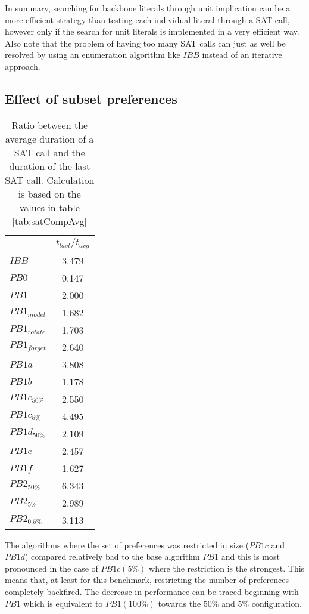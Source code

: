 In summary, searching for backbone literals through unit implication can be a more efficient strategy than testing each individual literal through a SAT call, however only if the search for unit literals is implemented in a very efficient way. Also note that the problem of having too many SAT calls can just as well be resolved by using an enumeration algorithm like $IBB$ instead of an iterative approach.

\subsection{Effect of subset preferences}

\begin{wraptable}{r}{5cm} %
\begin{tabular}{l| c }
 & $t_{last}/t_{avg}$  \\
\hline
$IBB$ & 3.479 \\
$PB0$ & 0.147 \\
$PB1$ & 2.000 \\
$PB1_{model}$ & 1.682 \\
$PB1_{rotate}$ & 1.703 \\
$PB1_{forget}$ & 2.640 \\
$PB1a$ & 3.808 \\
$PB1b$ & 1.178 \\
$PB1c_{50\%}$ & 2.550 \\
$PB1c_{5\%}$ & 4.495 \\
$PB1d_{50\%}$ & 2.109 \\
$PB1e$ & 2.457 \\
$PB1f$ & 1.627 \\
$PB2_{50\%}$ & 6.343 \\
$PB2_{5\%}$ & 2.989 \\
$PB2_{0.5\%}$ & 3.113 \\
\end{tabular}
\caption{Ratio between the average duration of a SAT call and the duration of the last SAT call. Calculation is based on the values in table \ref{tab:satCompAvg}}
\label{tab:lastTimeToAvgTime}
\end{wraptable}

The algorithms where the set of preferences was restricted in size ($PB1c$ and $PB1d$) compared relatively bad to the base algorithm $PB1$ and this is most pronounced in the case of $PB1c(5\%)$ where the restriction is the strongest. This means that, at least for this benchmark, restricting the number of preferences completely backfired. The decrease in performance can be traced beginning with $PB1$ which is equivalent to $PB1(100\%)$ towards the $50\%$ and $5\%$ configuration.

